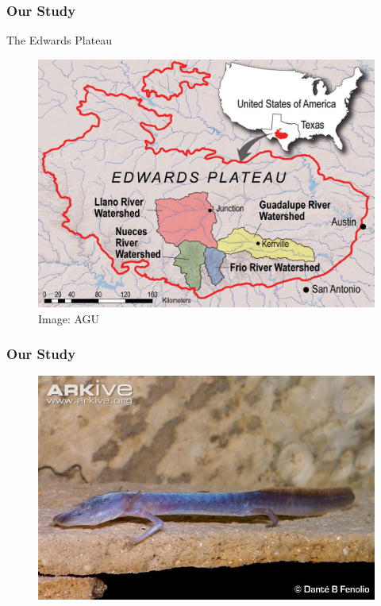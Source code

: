 \documentclass{beamer}
\begin{document}
\begin{frame}
\frametitle{Our Study}
\begin{block}{The Edwards Plateau}
\begin{figure}
    \includegraphics[scale=0.15]{pr_2010-06_map_hi-res.jpg}
    \caption{Image: AGU}
    \end{figure}
    \end{block}
\end{frame}

\begin{frame}
\frametitle{Our Study}
\begin{figure}
    \includegraphics[scale=0.65]{Long-shot-of-Austin-blind-salamander.jpg}
    \end{figure}
\end{frame}
\end{document}
